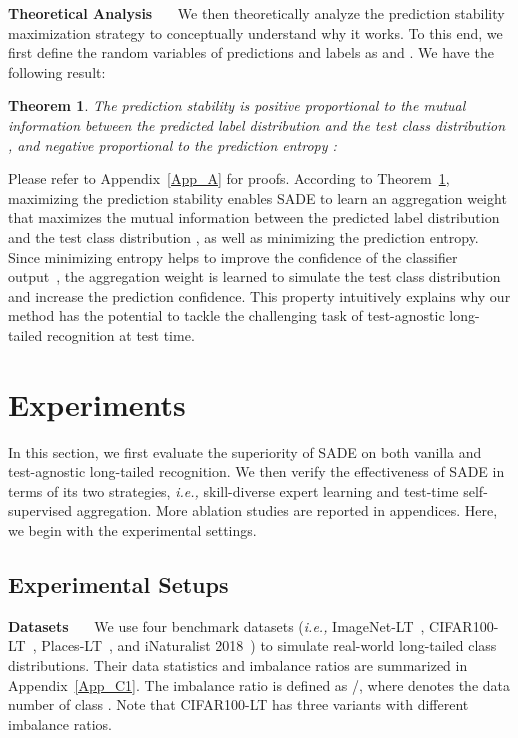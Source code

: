 \documentclass{article}
\newtheorem{thm}{Theorem}
\def\ie{\emph{i.e.}} \def\Ie{\emph{I.e.}}
\def\ie{\emph{i.e., }}
\begin{document}
\vspace{0.05in}
\textbf{Theoretical Analysis}~~~ 
We then theoretically analyze the  prediction stability maximization strategy to conceptually understand why it works. To this end, we first define the random variables of predictions  and labels as   and . We have the following result:
\begin{thm} \label{thm1} 
The prediction stability   is positive proportional  to  the mutual information between the predicted
label   distribution    and the test class distribution , and negative proportional  to the prediction entropy : 

\end{thm} 
Please refer to   Appendix~\ref{App_A} for proofs. According to Theorem~\ref{thm1}, maximizing the  prediction stability   enables SADE to learn an aggregation weight that maximizes the mutual information between the predicted label distribution      and the test class distribution , as well as minimizing the prediction entropy. Since  minimizing  entropy helps to improve the confidence of the classifier output~\cite{grandvalet2005semi}, the  aggregation weight is learned to simulate the test class distribution  and increase  the prediction confidence. This property intuitively explains why   our method has the potential to tackle the challenging task of test-agnostic long-tailed recognition at test time. 
 
   


 
\section{Experiments}
In this section, we first evaluate the superiority of SADE  on both  vanilla  and test-agnostic  long-tailed recognition.  We  then   verify the effectiveness of SADE in terms of its  two strategies, \ie skill-diverse expert learning  and  test-time self-supervised aggregation. More ablation studies are reported in  appendices. Here, we begin with the experimental settings.


\subsection{Experimental Setups}
\label{exp_setup}  
 
 \textbf{Datasets}~~~
We use four benchmark  datasets (\ie ImageNet-LT~\cite{liu2019large}, CIFAR100-LT~\cite{cao2019learning}, Places-LT~\cite{liu2019large}, and iNaturalist 2018~\cite{van2018inaturalist}) to simulate real-world long-tailed class distributions. Their data  statistics and imbalance ratios are summarized   in Appendix~\ref{App_C1}. The imbalance ratio is defined as /, where  denotes the data number of class .  Note that CIFAR100-LT has three variants with different imbalance ratios. 
\end{document}

